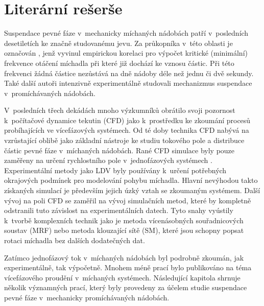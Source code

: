 \chapter{Literární rešerše}
Suspendace pevné fáze v~mechanicky míchaných nádobách patří v~posledních desetiletích ke značně studovanému jevu. Za průkopníka v~této oblasti je označován \citet{zwi58}, jenž vyvinul empirickou korelaci pro výpočet kritické (minimální) frekvence otáčení míchadla při které již dochází ke vznosu částic. Při této frekvenci žádná částice nezůstává na dně nádoby déle než jednu či dvě sekundy. Také další autoři \citep{nie68,bal78,arm98} intenzivně experimentálně studovali mechanizmus suspendace v~promíchávaných nádobách. 

V~posledních třech dekádách mnoho výzkumníků obrátilo svoji pozornost k~počítačové dynamice tekutin (CFD) jako k~prostředku ke zkoumání procesů probíhajících ve vícefázových systémech. Od té doby technika CFD nabývá na vzrůstající oblibě jako základní nástroje ke studiu tokového pole a distribuce částic pevné fáze v~míchaných nádobách. Rané CFD simulace byly pouze zaměřeny na určení rychlostního pole v~jednofázových systémech \citep{kre91}. Experimentální metody jako LDV byly používány k~určení potřebných okrajových podmínek pro modelování pohybu míchadla. Hlavní nevýhodou takto získaných simulací je především jejich úzký vztah se zkoumaným systémem. Další vývoj na poli CFD se zaměřil na vývoj simulačních metod, které by kompletně odstranili tuto závislost na experimentálních datech. Tyto snahy vyústily k~tvorbě komplexních technik jako je metoda vícenásobných souřadnicových soustav (MRF) nebo metoda klouzající sítě (SM), které jsou schopny popsat rotaci míchadla bez dalších dodatečných dat.  

Zatímco jednofázový tok v~míchaných nádobách byl podrobně zkoumán, jak experimentálně, tak výpočetně. Mnohem méně prací bylo publikováno na téma vícefázového proudění v~míchaných systémech. Následující kapitola shrnuje několik významných prací, který byly provedeny za účelem studie suspendace pevné fáze v~mechanicky promíchávaných nádobách.
  
